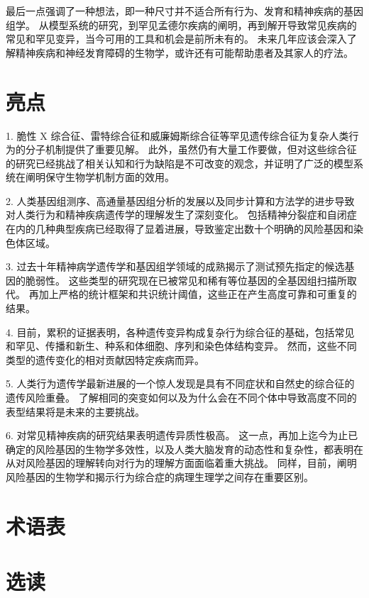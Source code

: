 最后一点强调了一种想法，即一种尺寸并不适合所有行为、发育和精神疾病的基因组学。 
从模型系统的研究，到罕见孟德尔疾病的阐明，再到解开导致常见疾病的常见和罕见变异，当今可用的工具和机会是前所未有的。 
未来几年应该会深入了解精神疾病和神经发育障碍的生物学，或许还有可能帮助患者及其家人的疗法。


\section{亮点}

1. 脆性 X 综合征、雷特综合征和威廉姆斯综合征等罕见遗传综合征为复杂人类行为的分子机制提供了重要见解。 
此外，虽然仍有大量工作要做，但对这些综合征的研究已经挑战了相关认知和行为缺陷是不可改变的观念，并证明了广泛的模型系统在阐明保守生物学机制方面的效用。


2. 人类基因组测序、高通量基因组分析的发展以及同步计算和方法学的进步导致对人类行为和精神疾病遗传学的理解发生了深刻变化。 
包括精神分裂症和自闭症在内的几种典型疾病已经取得了显着进展，导致鉴定出数十个明确的风险基因和染色体区域。


3. 过去十年精神病学遗传学和基因组学领域的成熟揭示了测试预先指定的候选基因的脆弱性。 
这些类型的研究现在已被常见和稀有等位基因的全基因组扫描所取代。 
再加上严格的统计框架和共识统计阈值，这些正在产生高度可靠和可重复的结果。


4. 目前，累积的证据表明，各种遗传变异构成复杂行为综合征的基础，包括常见和罕见、传播和新生、种系和体细胞、序列和染色体结构变异。 
然而，这些不同类型的遗传变化的相对贡献因特定疾病而异。


5. 人类行为遗传学最新进展的一个惊人发现是具有不同症状和自然史的综合征的遗传风险重叠。 
了解相同的突变如何以及为什么会在不同个体中导致高度不同的表型结果将是未来的主要挑战。


6. 对常见精神疾病的研究结果表明遗传异质性极高。 
这一点，再加上迄今为止已确定的风险基因的生物学多效性，以及人类大脑发育的动态性和复杂性，都表明在从对风险基因的理解转向对行为的理解方面面临着重大挑战。 
同样，目前，阐明风险基因的生物学和揭示行为综合症的病理生理学之间存在重要区别。

\section{术语表}

\section{选读}




